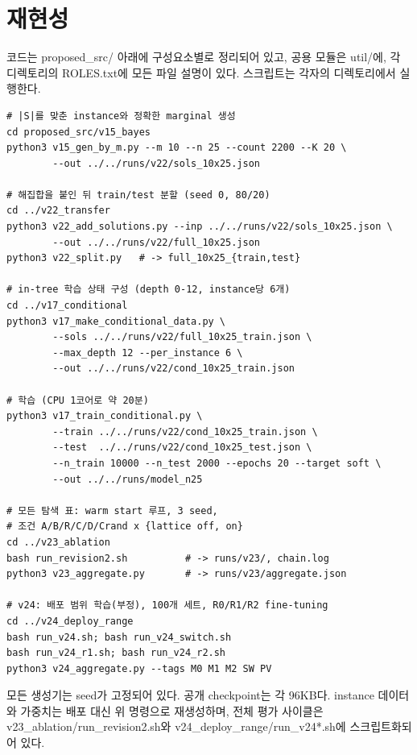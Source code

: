 \documentclass[final,5p,twocolumn]{elsarticle}
\begin{document}
\section*{재현성}
코드는 proposed\_src/ 아래에 구성요소별로 정리되어 있고, 공용 모듈은 util/에, 각 디렉토리의 ROLES.txt에 모든 파일 설명이 있다. 스크립트는 각자의 디렉토리에서 실행한다.

{\footnotesize\begin{verbatim}
# |S|를 맞춘 instance와 정확한 marginal 생성
cd proposed_src/v15_bayes
python3 v15_gen_by_m.py --m 10 --n 25 --count 2200 --K 20 \
        --out ../../runs/v22/sols_10x25.json

# 해집합을 붙인 뒤 train/test 분할 (seed 0, 80/20)
cd ../v22_transfer
python3 v22_add_solutions.py --inp ../../runs/v22/sols_10x25.json \
        --out ../../runs/v22/full_10x25.json
python3 v22_split.py   # -> full_10x25_{train,test}

# in-tree 학습 상태 구성 (depth 0-12, instance당 6개)
cd ../v17_conditional
python3 v17_make_conditional_data.py \
        --sols ../../runs/v22/full_10x25_train.json \
        --max_depth 12 --per_instance 6 \
        --out ../../runs/v22/cond_10x25_train.json

# 학습 (CPU 1코어로 약 20분)
python3 v17_train_conditional.py \
        --train ../../runs/v22/cond_10x25_train.json \
        --test  ../../runs/v22/cond_10x25_test.json \
        --n_train 10000 --n_test 2000 --epochs 20 --target soft \
        --out ../../runs/model_n25

# 모든 탐색 표: warm start 루프, 3 seed,
# 조건 A/B/R/C/D/Crand x {lattice off, on}
cd ../v23_ablation
bash run_revision2.sh          # -> runs/v23/, chain.log
python3 v23_aggregate.py       # -> runs/v23/aggregate.json

# v24: 배포 범위 학습(부정), 100개 세트, R0/R1/R2 fine-tuning
cd ../v24_deploy_range
bash run_v24.sh; bash run_v24_switch.sh
bash run_v24_r1.sh; bash run_v24_r2.sh
python3 v24_aggregate.py --tags M0 M1 M2 SW PV
\end{verbatim}}
모든 생성기는 seed가 고정되어 있다. 공개 checkpoint는 각 96KB다. instance 데이터와 가중치는 배포 대신 위 명령으로 재생성하며, 전체 평가 사이클은 v23\_ablation/run\_revision2.sh와 v24\_deploy\_range/run\_v24*.sh에 스크립트화되어 있다.
\end{document}

